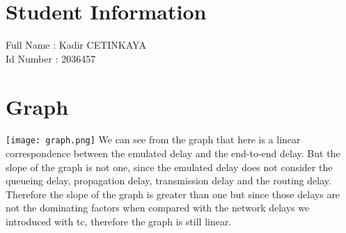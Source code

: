 \documentclass[12pt]{article}
\begin{document}
\section*{Student Information } 
Full Name : Kadir CETINKAYA \\
Id Number : 2036457 \\

\section*{Graph}
\texttt{[image: graph.png]}
We can see from the graph that here is a linear correspondence
between the emulated delay and the end-to-end delay. But the
slope of the graph is not one, since the emulated delay does not
consider the queueing delay, propagation delay, transmission delay
and the routing delay. Therefore the slope of the graph is greater
than one but since those delays are not the dominating factors when
compared with the network delays we introduced with tc, therefore
the graph is still linear.
\end{document}
